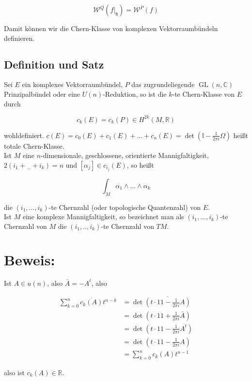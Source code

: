 \documentclass[10pt, letterpaper]{article}
\begin{document}
$$
\mathcal{W}^{Q}\left(\left.f\right|_{\mathfrak{h}}\right)=\mathcal{W}^{P}(f)
$$

Damit können wir die Chern-Klasse von komplexen Vektorraumbündeln definieren.

\subsection*{Definition und Satz}
Sei $E$ ein komplexes Vektorraumbündel, $P$ das zugrundeliegende $\operatorname{GL}(n, \mathbb{C})$ Prinzipalbündel oder eine $U(n)$-Reduktion, so ist die $k$-te Chern-Klasse von $E$ durch

$$
c_{k}(E)=c_{k}(P) \in H^{2 k}(M, \mathbb{R})
$$

wohldefiniert. $c(E)=c_{0}(E)+c_{1}(E)+\ldots+c_{n}(E)=\operatorname{det}\left(\mathbb{l}-\frac{1}{2 \pi i} \Omega\right)$ heißt totale Chern-Klasse.\\
Ist $M$ eine $n$-dimensionale, geschlossene, orientierte Mannigfaltigkeit, $2\left(i_{1}+\right. \left.{ }_{\ldots}+i_{k}\right)=n$ und $\left[\alpha_{j}\right] \in c_{i_{j}}(E)$, so heißt

$$
\int_{M} \alpha_{1} \wedge \ldots \wedge \alpha_{k}
$$

die $\left(i_{1}, \ldots, i_{k}\right)$-te Chernzahl (oder topologische Quantenzahl) von $E$.\\
Ist $M$ eine komplexe Mannigfaltigkeit, so bezeichnet man als $\left(i_{1}, \ldots, i_{k}\right)$-te Chernzahl von $M$ die $\left(i_{1}, . ., i_{k}\right)$-te Chernzahl von $T M$.

\section*{Beweis:}
Ist $A \in u(n)$, also $\bar{A}=-A^{t}$, also

$$
\begin{aligned}
\sum_{k=0}^{n} \overline{c_{k}(A)} t^{n-k} & =\operatorname{det} \overline{\left(t \cdot 11-\frac{1}{2 \pi i} A\right)} \\
& =\operatorname{det}\left(t \cdot 11+\frac{1}{2 \pi i} \bar{A}\right) \\
& =\operatorname{det}\left(t \cdot 11-\frac{1}{2 \pi i} A^{t}\right) \\
& =\operatorname{det}\left(t \cdot 11-\frac{1}{2 \pi i} A\right) \\
& =\sum_{k=0}^{n} c_{k}(A) t^{n-1}
\end{aligned}
$$

also ist $c_{k}(A) \in \mathbb{R}$.
\end{document}
